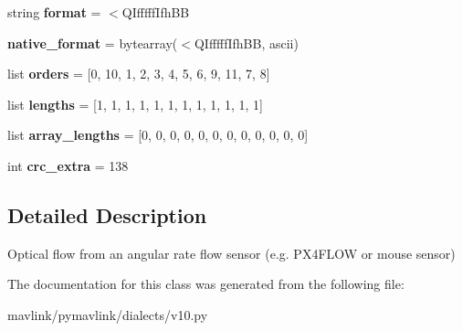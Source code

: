 \begin{DoxyCompactItemize}
\item 
\mbox{\label{classpymavlink_1_1dialects_1_1v10_1_1MAVLink__optical__flow__rad__message_a0f64633b286bac62eb72e5fc4250cebb}} 
string {\bfseries format} = \textquotesingle{}$<$Q\+Ifffff\+Ifh\+BB\textquotesingle{}
\item 
\mbox{\label{classpymavlink_1_1dialects_1_1v10_1_1MAVLink__optical__flow__rad__message_aa40bfe46a8a454ab5f073d28a312d606}} 
{\bfseries native\+\_\+format} = bytearray(\textquotesingle{}$<$Q\+Ifffff\+Ifh\+BB\textquotesingle{}, \textquotesingle{}ascii\textquotesingle{})
\item 
\mbox{\label{classpymavlink_1_1dialects_1_1v10_1_1MAVLink__optical__flow__rad__message_a14d3c7f288846a4507d09db667f95ece}} 
list {\bfseries orders} = \mbox{[}0, 10, 1, 2, 3, 4, 5, 6, 9, 11, 7, 8\mbox{]}
\item 
\mbox{\label{classpymavlink_1_1dialects_1_1v10_1_1MAVLink__optical__flow__rad__message_ae6ae7d8f7e7869a4261c3dfcbb0ce9e9}} 
list {\bfseries lengths} = \mbox{[}1, 1, 1, 1, 1, 1, 1, 1, 1, 1, 1, 1\mbox{]}
\item 
\mbox{\label{classpymavlink_1_1dialects_1_1v10_1_1MAVLink__optical__flow__rad__message_a4e8fa002a4517908bac9aa66967fb1f4}} 
list {\bfseries array\+\_\+lengths} = \mbox{[}0, 0, 0, 0, 0, 0, 0, 0, 0, 0, 0, 0\mbox{]}
\item 
\mbox{\label{classpymavlink_1_1dialects_1_1v10_1_1MAVLink__optical__flow__rad__message_a4fb8570b17a41bed5ddf2e9f05fdd6b6}} 
int {\bfseries crc\+\_\+extra} = 138
\end{DoxyCompactItemize}


\subsection{Detailed Description}
\begin{DoxyVerb}Optical flow from an angular rate flow sensor (e.g. PX4FLOW or
mouse sensor)
\end{DoxyVerb}
 

The documentation for this class was generated from the following file\+:\begin{DoxyCompactItemize}
\item 
mavlink/pymavlink/dialects/v10.\+py\end{DoxyCompactItemize}
